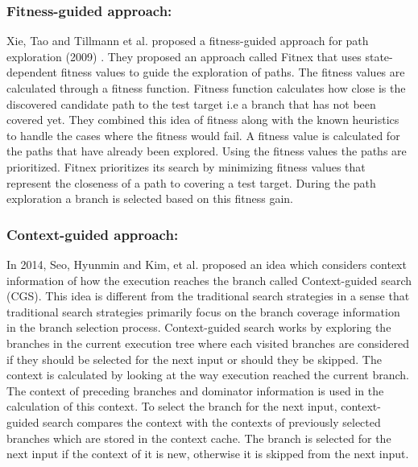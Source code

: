 \documentclass[ runningheads,
               a4paper]{llncs}
\begin{document}
\subsubsection{Fitness-guided approach:}
Xie, Tao and Tillmann et al. proposed a fitness-guided approach for path exploration (2009) \cite{xie2009fitness}. They proposed an approach called Fitnex that uses state-dependent fitness values to guide the exploration of paths. The fitness values are calculated through a fitness function. Fitness function calculates how close is the discovered candidate path to the test target i.e a branch that has not been covered yet. They combined this idea of fitness along with the known heuristics to handle the cases where the fitness would fail. A fitness value is calculated for the paths that have already been explored. Using the fitness values the paths are prioritized. Fitnex prioritizes its search by minimizing fitness values that represent the closeness of a path to covering a test target. During the path exploration a branch is selected based on this fitness gain.


\subsubsection{Context-guided approach:}
In 2014, Seo, Hyunmin and Kim, et al. proposed an idea \cite{seo2014we} which considers context information of how the execution reaches the branch called Context-guided search (CGS). This idea is different from the traditional search strategies in a sense that traditional search strategies primarily focus on the branch coverage information in the branch selection process. Context-guided search works by exploring the branches in the current execution tree where each visited branches are considered if they should be selected for the next input or should they be skipped. The context is calculated by looking at the way execution reached the current branch. The context of preceding branches and dominator information is used in the calculation of this context. To select the branch for the next input, context-guided search compares the context with the contexts of previously selected branches which are stored in the context cache. The branch is selected for the next input if the context of it is new, otherwise it is skipped from the next input.
\end{document}
